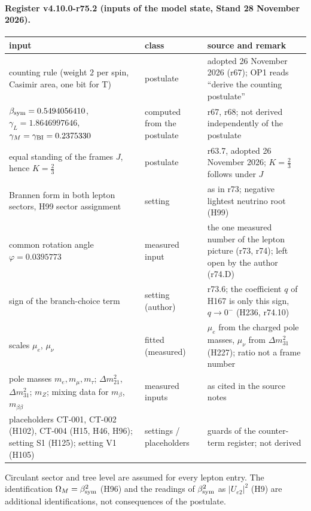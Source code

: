 \paragraph{Register v4.10.0-r75.2 (inputs of the model state, Stand 28 November 2026).}
\begin{center}
\small
\begin{tabular}{@{}>{\raggedright\arraybackslash}p{}>{\raggedright\arraybackslash}p{}>{\raggedright\arraybackslash}p{}@{}}
\toprule
input & class & source and remark\\
\midrule
counting rule (weight \(2\) per spin, Casimir area, one bit for T) & postulate & adopted 26 November 2026 (r67); OP1 reads ``derive the counting postulate''\\
\(\beta_{\rm sym}=0.5494056410\), \(\gamma_L=1.8646997646\), \(\gamma_M=\gamma_{\rm BI}=0.2375330\) & computed from the postulate & r67, r68; not derived independently of the postulate\\
equal standing of the frames \(J\), hence \(K=\tfrac23\) & postulate & r63.7, adopted 26 November 2026; \(K=\tfrac23\) follows under \(J\)\\
Brannen form in both lepton sectors, H99 sector assignment & setting & as in r73; negative lightest neutrino root (H99)\\
common rotation angle \(\varphi=0.0395773\) & measured input & the one measured number of the lepton picture (r73, r74); left open by the author (r74.D)\\
sign of the branch-choice term & setting (author) & r73.6; the coefficient \(q\) of H167 is only this sign, \(q\to0^-\) (H236, r74.10)\\
scales \(\mu_e\), \(\mu_\nu\) & fitted (measured) & \(\mu_e\) from the charged pole masses, \(\mu_\nu\) from \(\Delta m^2_{31}\) (H227); ratio not a frame number\\
pole masses \(m_e,m_\mu,m_\tau\); \(\Delta m^2_{21}\), \(\Delta m^2_{31}\); \(m_Z\); mixing data for \(m_\beta\), \(m_{\beta\beta}\) & measured inputs & as cited in the source notes\\
placeholders CT-001, CT-002 (H102), CT-004 (H15, H46, H96); setting S1 (H125); setting V1 (H105) & settings / placeholders & guards of the counter-term register; not derived\\
\bottomrule
\end{tabular}
\end{center}
Circulant sector and tree level are assumed for every lepton entry.  The identification \(\Omega_M=\beta_{\rm sym}^2\) (H96) and the readings of
\(\beta_{\rm sym}^2\) as \(|U_{e2}|^2\) (H9) are additional identifications, not consequences of the postulate.

